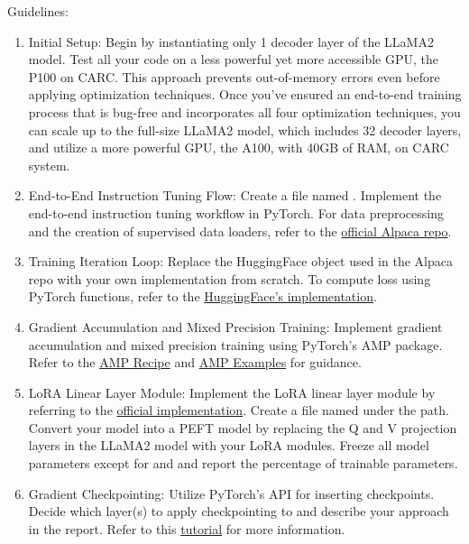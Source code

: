 Guidelines:
\begin{enumerate}
\item Initial Setup: Begin by instantiating only 1 decoder layer of the LLaMA2 model. Test all your code on a less powerful yet more accessible GPU, the P100 on CARC. This approach prevents out-of-memory errors even before applying optimization techniques. Once you've ensured an end-to-end training process that is bug-free and incorporates all four optimization techniques, you can scale up to the full-size LLaMA2 model, which includes 32 decoder layers, and utilize a more powerful GPU, the A100, with 40GB of RAM, on CARC system.
\item End-to-End Instruction Tuning Flow: Create a file named . Implement the end-to-end instruction tuning workflow in PyTorch. For data preprocessing and the creation of supervised data loaders, refer to the \href{https://github.com/tatsu-lab/stanford_alpaca/blob/main/train.py}{official Alpaca repo}.
\item Training Iteration Loop: Replace the HuggingFace  object used in the Alpaca repo with your own implementation from scratch. To compute loss using PyTorch functions, refer to the \href{https://github.com/huggingface/transformers/blob/dc68a39c8111217683bf49a4912d0c9018bab33d/src/transformers/models/llama/modeling_llama.py#L1056}{HuggingFace's implementation}.
\item Gradient Accumulation and Mixed Precision Training: Implement gradient accumulation and mixed precision training using PyTorch's AMP package. Refer to the \href{https://pytorch.org/tutorials/recipes/recipes/amp_recipe.html}{AMP Recipe} and \href{https://pytorch.org/docs/stable/notes/amp_examples.html}{AMP Examples} for guidance.
\item LoRA Linear Layer Module: Implement the LoRA linear layer module by referring to the \href{https://github.com/microsoft/LoRA/blob/3f5c193f431c8a09448f0184f6f883ad393f22d0/loralib/layers.py#L90}{official implementation}. Create a file named  under the  path. Convert your model into a PEFT model by replacing the Q and V projection layers in the LLaMA2 model with your LoRA  modules. Freeze all model parameters except for  and  and report the percentage of trainable parameters.
\item Gradient Checkpointing: Utilize PyTorch's  API for inserting checkpoints. Decide which layer(s) to apply checkpointing to and describe your approach in the report. Refer to this \href{https://qywu.github.io/2019/05/22/explore-gradient-checkpointing.html}{tutorial} for more information.

\end{enumerate}
